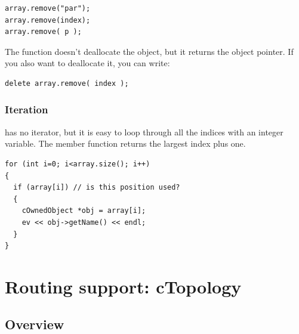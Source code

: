 \begin{verbatim}
array.remove("par");
array.remove(index);
array.remove( p );
\end{verbatim}


The  function doesn't deallocate the object, but it
returns the object pointer. If you also want to deallocate it, you can
write:

\begin{verbatim}
delete array.remove( index );
\end{verbatim}

\subsubsection{Iteration}


 has no iterator, but it is easy to loop through all the
indices with an integer variable. The  member function
returns the largest index plus one.

\begin{verbatim}
for (int i=0; i<array.size(); i++)
{
  if (array[i]) // is this position used?
  {
    cOwnedObject *obj = array[i];
    ev << obj->getName() << endl;
  }
}
\end{verbatim}


%
%
%
%




\section{Routing support: cTopology}

\subsection{Overview}

